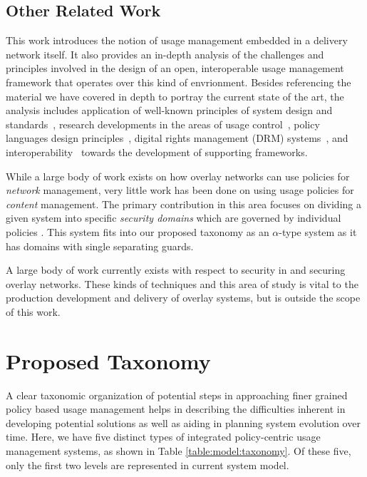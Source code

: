 \documentclass[12pt,letterpaper]{article}
\begin{document}
\subsection{Other Related Work}
This work introduces the notion of usage management embedded in a delivery network itself.  It also provides an in-depth analysis of the challenges and principles involved in the design of an open, interoperable usage management framework that operates over this kind of envrionment. Besides referencing the material we have covered in depth to portray the current state of the art, the analysis includes application of well-known principles of system design and standards~\cite{BlCl:01,Cl:88,ClWrSoBr:02}, research developments in the areas of usage control~\cite{PaSa:04,JaHeLa:10}, policy languages design principles~\cite{JaHeMa:06}, digital rights management (DRM) systems~\cite{JaHe:09},  and interoperability~\cite{JaHe:04,HeJa:05,KoLaMaMi:04,coral,marlin} towards the development of supporting frameworks.

While a large body of work exists on how overlay networks can use policies for \textit{network} management, very little work has been done on using usage policies for \textit{content} management.  The primary contribution in this area focuses on dividing a given system into specific \textit{security domains} which are governed by individual policies \cite{4457175}.  This system fits into our proposed taxonomy as an $\alpha$-type system as it has domains with single separating guards.

A large body of work currently exists with respect to security in and securing overlay networks.  These kinds of techniques and this area of study is vital to the production development and delivery of overlay systems, but is outside the scope of this work.

\section{Proposed Taxonomy}
A clear taxonomic organization of potential steps in approaching finer grained policy based usage management helps in describing the difficulties inherent in developing potential solutions as well as aiding in planning system evolution over time. Here, we have five distinct types of integrated policy-centric usage management systems, as shown in Table \ref{table:model:taxonomy}.  Of these five, only the first two levels are represented in current system model.
\end{document}
